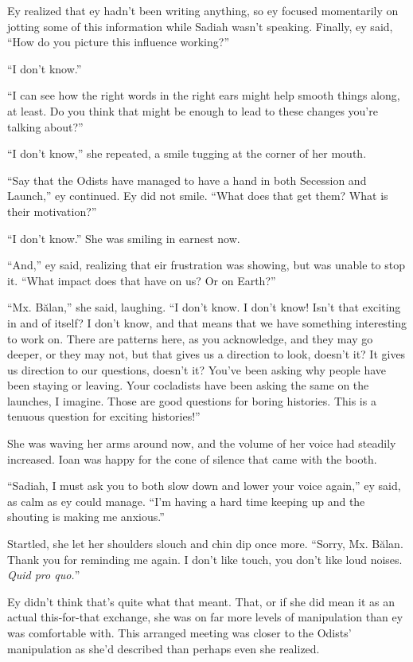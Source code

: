Ey realized that ey hadn't been writing anything, so ey focused momentarily on jotting some of this information while Sadiah wasn't speaking. Finally, ey said, ``How do you picture this influence working?''

``I don't know.''

``I can see how the right words in the right ears might help smooth things along, at least. Do you think that might be enough to lead to these changes you're talking about?''

``I don't know,'' she repeated, a smile tugging at the corner of her mouth.

``Say that the Odists have managed to have a hand in both Secession and Launch,'' ey continued. Ey did not smile. ``What does that get them? What is their motivation?''

``I don't know.'' She was smiling in earnest now.

``And,'' ey said, realizing that eir frustration was showing, but was unable to stop it. ``What impact does that have on us? Or on Earth?''

``Mx. Bălan,'' she said, laughing. ``I don't know. I don't know! Isn't that exciting in and of itself? I don't know, and that means that we have something interesting to work on. There are patterns here, as you acknowledge, and they may go deeper, or they may not, but that gives us a direction to look, doesn't it? It gives us direction to our questions, doesn't it? You've been asking why people have been staying or leaving. Your cocladists have been asking the same on the launches, I imagine. Those are good questions for boring histories. This is a tenuous question for exciting histories!''

She was waving her arms around now, and the volume of her voice had steadily increased. Ioan was happy for the cone of silence that came with the booth.

``Sadiah, I must ask you to both slow down and lower your voice again,'' ey said, as calm as ey could manage. ``I'm having a hard time keeping up and the shouting is making me anxious.''

Startled, she let her shoulders slouch and chin dip once more. ``Sorry, Mx. Bălan. Thank you for reminding me again. I don't like touch, you don't like loud noises. \emph{Quid pro quo.}''

Ey didn't think that's quite what that meant. That, or if she did mean it as an actual this-for-that exchange, she was on far more levels of manipulation than ey was comfortable with. This arranged meeting was closer to the Odists' manipulation as she'd described than perhaps even she realized.

